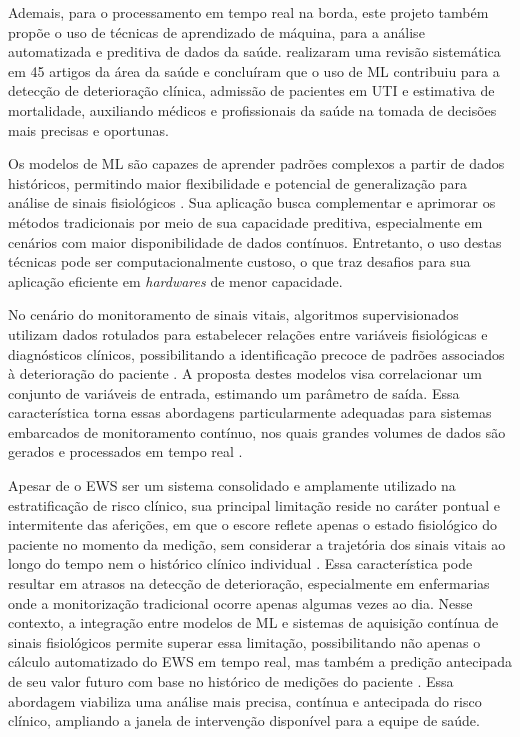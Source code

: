 Ademais, para o processamento em tempo real na borda, este projeto também propõe o uso de técnicas de aprendizado de máquina, para a análise automatizada e preditiva de dados da saúde.  realizaram uma revisão sistemática em 45 artigos da área da saúde e concluíram que o uso de ML contribuiu para a detecção de deterioração clínica, admissão de pacientes em UTI e estimativa de mortalidade, auxiliando médicos e profissionais da saúde na tomada de decisões mais precisas e oportunas. 


Os modelos de ML são capazes de aprender padrões complexos a partir de dados históricos, permitindo maior flexibilidade e potencial de generalização para análise de sinais fisiológicos \cite{churpek2016}. Sua aplicação busca complementar e aprimorar os métodos tradicionais por meio de sua capacidade preditiva, especialmente em cenários com maior disponibilidade de dados contínuos. Entretanto, o uso destas técnicas pode ser computacionalmente custoso, o que traz desafios para sua aplicação eficiente em \textit{hardwares} de menor capacidade.

No cenário do monitoramento de sinais vitais, algoritmos supervisionados utilizam dados rotulados para estabelecer relações entre variáveis fisiológicas e diagnósticos clínicos, possibilitando a identificação precoce de padrões associados à deterioração do paciente \cite{nemati2018}. A proposta destes modelos visa correlacionar um conjunto de variáveis de entrada, estimando um parâmetro de saída. Essa característica torna essas abordagens particularmente adequadas para sistemas embarcados de monitoramento contínuo, nos quais grandes volumes de dados são gerados e processados em tempo real \cite{haveman2022}.

Apesar de o EWS ser um sistema consolidado e amplamente utilizado na estratificação de risco clínico, sua principal limitação reside no caráter pontual e intermitente das aferições, em que o escore reflete apenas o estado fisiológico do paciente no momento da medição, sem considerar a trajetória dos sinais vitais ao longo do tempo nem o histórico clínico individual \cite{muralitharan}. Essa característica pode resultar em atrasos na detecção de deterioração, especialmente em enfermarias onde a monitorização tradicional ocorre apenas algumas vezes ao dia. Nesse contexto, a integração entre modelos de ML e sistemas de aquisição contínua de sinais fisiológicos permite superar essa limitação, possibilitando não apenas o cálculo automatizado do EWS em tempo real, mas também a predição antecipada de seu valor futuro com base no histórico de medições do paciente \cite{salehinejad}. Essa abordagem viabiliza uma análise mais precisa, contínua e antecipada do risco clínico, ampliando a janela de intervenção disponível para a equipe de saúde.
